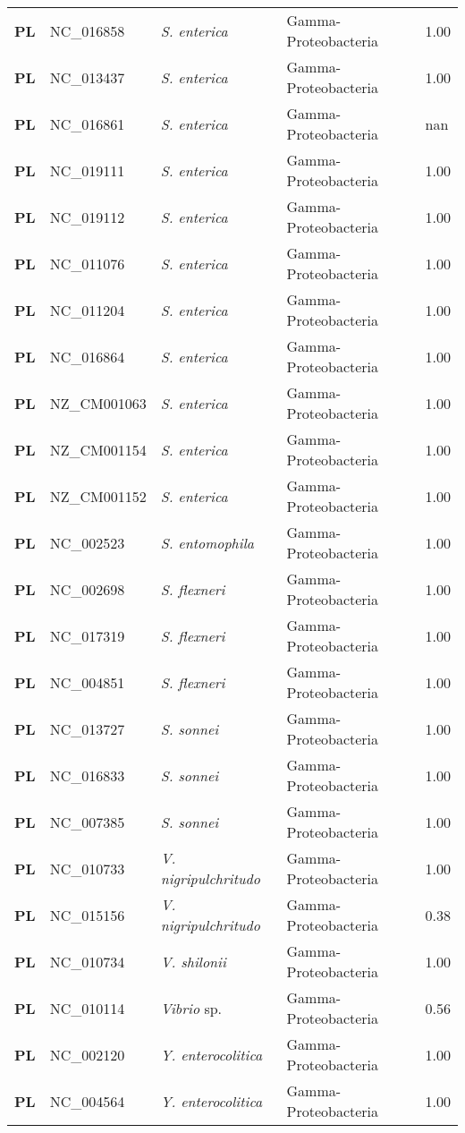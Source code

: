 \begin{adjustwidth}{-3cm}{2cm}
{\begin{supertabular}{>{\bfseries}l|p{0.1\textwidth}p{0.14\textwidth}l|l}
PL & NC\_016858 & \textit{S. enterica} & Gamma-Proteobacteria & 1.00\\
PL & NC\_013437 & \textit{S. enterica} & Gamma-Proteobacteria & 1.00\\
PL & NC\_016861 & \textit{S. enterica} & Gamma-Proteobacteria & nan\\
PL & NC\_019111 & \textit{S. enterica} & Gamma-Proteobacteria & 1.00\\
PL & NC\_019112 & \textit{S. enterica} & Gamma-Proteobacteria & 1.00\\
PL & NC\_011076 & \textit{S. enterica} & Gamma-Proteobacteria & 1.00\\
PL & NC\_011204 & \textit{S. enterica} & Gamma-Proteobacteria & 1.00\\
PL & NC\_016864 & \textit{S. enterica} & Gamma-Proteobacteria & 1.00\\
PL & NZ\_CM001063 & \textit{S. enterica} & Gamma-Proteobacteria & 1.00\\
PL & NZ\_CM001154 & \textit{S. enterica} & Gamma-Proteobacteria & 1.00\\
PL & NZ\_CM001152 & \textit{S. enterica} & Gamma-Proteobacteria & 1.00\\
PL & NC\_002523 & \textit{S. entomophila} & Gamma-Proteobacteria & 1.00\\
PL & NC\_002698 & \textit{S. flexneri} & Gamma-Proteobacteria & 1.00\\
PL & NC\_017319 & \textit{S. flexneri} & Gamma-Proteobacteria & 1.00\\
PL & NC\_004851 & \textit{S. flexneri} & Gamma-Proteobacteria & 1.00\\
PL & NC\_013727 & \textit{S. sonnei} & Gamma-Proteobacteria & 1.00\\
PL & NC\_016833 & \textit{S. sonnei} & Gamma-Proteobacteria & 1.00\\
PL & NC\_007385 & \textit{S. sonnei} & Gamma-Proteobacteria & 1.00\\
PL & NC\_010733 & \textit{V. nigripulchritudo} & Gamma-Proteobacteria & 1.00\\
PL & NC\_015156 & \textit{V. nigripulchritudo} & Gamma-Proteobacteria & 0.38\\
PL & NC\_010734 & \textit{V. shilonii} & Gamma-Proteobacteria & 1.00\\
PL & NC\_010114 & \textit{Vibrio} sp. & Gamma-Proteobacteria & 0.56\\
PL & NC\_002120 & \textit{Y. enterocolitica} & Gamma-Proteobacteria & 1.00\\
PL & NC\_004564 & \textit{Y. enterocolitica} & Gamma-Proteobacteria & 1.00\\

\end{supertabular}}
\end{adjustwidth}
